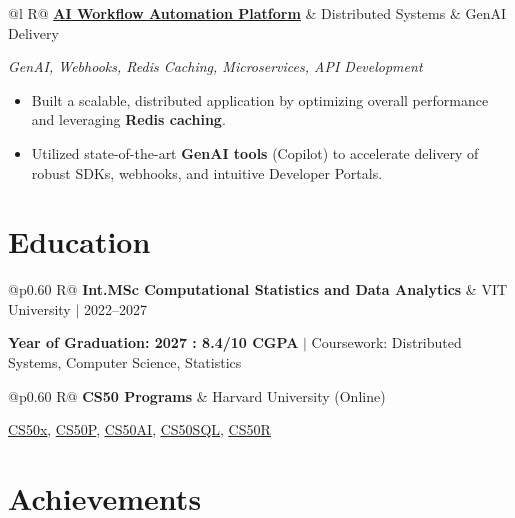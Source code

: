 \documentclass[a4paper,10pt]{article}
\newcommand{\ulink}[2]{\href{#1}{\uline{#2}}}
\newcommand{\subheading}[1]{{\color[HTML]{0A0A0A}\fontsize{12}{14}\selectfont\bfseries #1}}
\newcommand{\techstack}[1]{{\color[HTML]{5C5C5C}\fontsize{10.5}{12.5}\selectfont\itshape #1}}
\newcommand{\meta}[1]{{\color[HTML]{5C5C5C}\fontsize{10.5}{12.5}\selectfont #1}}
\begin{document}
\begin{tabularx}{\linewidth}{@{}l R@{}}
\subheading{\ulink{https://github.com/su-jin1425/AI-Workflow-Automation-Platform}{AI Workflow Automation Platform}} & \meta{Distributed Systems \& GenAI Delivery}
\end{tabularx}
\techstack{GenAI, Webhooks, Redis Caching, Microservices, API Development}
\begin{itemize}[nosep, leftmargin=1.5em, itemsep=2pt, topsep=2pt]
  \item {\color[HTML]{0A0A0A}\fontsize{11}{14}\selectfont Built a scalable, distributed application by optimizing overall performance and leveraging \textbf{Redis caching}.}
  \item {\color[HTML]{0A0A0A}\fontsize{11}{14}\selectfont Utilized state-of-the-art \textbf{GenAI tools} (Copilot) to accelerate delivery of robust SDKs, webhooks, and intuitive Developer Portals.}
\end{itemize}

\section{Education}
\vspace{2pt}

\begin{tabularx}{\linewidth}{@{}p{0.60\linewidth} R@{}}
\subheading{Int.MSc Computational Statistics and Data Analytics} & \meta{VIT University $|$ 2022--2027}
\end{tabularx}
{\color[HTML]{3A3A3A}\fontsize{11}{14}\selectfont \textbf{Year of Graduation: 2027 : 8.4/10 CGPA} $|$ Coursework: Distributed Systems, Computer Science, Statistics}

\begin{tabularx}{\linewidth}{@{}p{0.60\linewidth} R@{}}
\subheading{CS50 Programs} & \meta{Harvard University (Online)}
\end{tabularx}
{\color[HTML]{3A3A3A}\fontsize{11}{14}\selectfont \ulink{https://cs50.harvard.edu/certificates/b14b78df-e05c-413e-a607-1dd27303053a}{CS50x}, \ulink{https://cs50.harvard.edu/certificates/32477052-9db4-49c4-a5a4-d7e58429ca2c}{CS50P}, \ulink{https://cs50.harvard.edu/certificates/9cdb4d4a-1250-4f8e-9fd7-191864e0f919}{CS50AI}, \ulink{https://cs50.harvard.edu/certificates/bc486f24-f085-4e61-8536-80940b97a1b9}{CS50SQL}, \ulink{https://cs50.harvard.edu/certificates/666838e6-a053-4d82-b179-a60fe745fd84}{CS50R}}

\section{Achievements}
\vspace{2pt}
\end{document}
